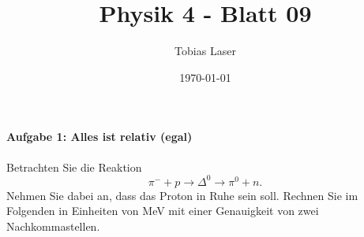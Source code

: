 \documentclass[11pt,a4paper]{scrartcl}
\begin{document}
    \title{Physik 4 - Blatt 09}
    \author{Tobias Laser}
    \date{\today}
    \maketitle
    \vfill
    \thispagestyle{empty}
    \newpage


    \paragraph{Aufgabe 1: Alles ist relativ (egal)}

    Betrachten Sie die Reaktion
    \[
        \pi^- + p \longrightarrow \Delta^0 \longrightarrow \pi^0+n.
    \]
    Nehmen Sie dabei an, dass das Proton in Ruhe sein soll. Rechnen Sie im Folgenden
    in Einheiten von MeV mit einer Genauigkeit von zwei Nachkommastellen.
\end{document}

